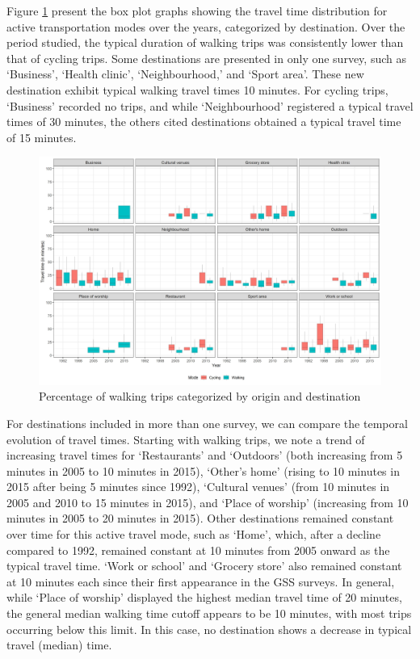 \documentclass[preprint, 3p,
authoryear]{elsarticle} %
\begin{document}
Figure \ref{fig:figure-boxplot} present the box plot graphs showing the
travel time distribution for active transportation modes over the years,
categorized by destination. Over the period studied, the typical
duration of walking trips was consistently lower than that of cycling
trips. Some destinations are presented in only one survey, such as
`Business', `Health clinic', `Neighbourhood,' and `Sport area'. These
new destination exhibit typical walking travel times 10 minutes. For
cycling trips, `Business' recorded no trips, and while `Neighbourhood'
registered a typical travel times of 30 minutes, the others cited
destinations obtained a typical travel time of 15 minutes.

\begin{figure}
\includegraphics[width=1\linewidth]{figures/destination_boxplots} \caption{Percentage of walking trips categorized by origin and destination}\label{fig:figure-boxplot}
\end{figure}

For destinations included in more than one survey, we can compare the
temporal evolution of travel times. Starting with walking trips, we note
a trend of increasing travel times for `Restaurants' and `Outdoors'
(both increasing from 5 minutes in 2005 to 10 minutes in 2015), `Other's
home' (rising to 10 minutes in 2015 after being 5 minutes since 1992),
`Cultural venues' (from 10 minutes in 2005 and 2010 to 15 minutes in
2015), and `Place of worship' (increasing from 10 minutes in 2005 to 20
minutes in 2015). Other destinations remained constant over time for
this active travel mode, such as `Home', which, after a decline compared
to 1992, remained constant at 10 minutes from 2005 onward as the typical
travel time. `Work or school' and `Grocery store' also remained constant
at 10 minutes each since their first appearance in the GSS surveys. In
general, while `Place of worship' displayed the highest median travel
time of 20 minutes, the general median walking time cutoff appears to be
10 minutes, with most trips occurring below this limit. In this case, no
destination shows a decrease in typical travel (median) time.
\end{document}
